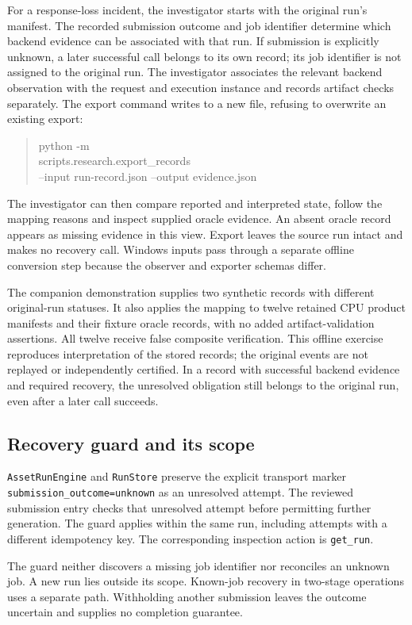 \documentclass[conference,letterpaper,10pt]{IEEEtran}
\begin{document}
For a response-loss incident, the investigator starts with the original run's
manifest. The recorded submission outcome and job identifier determine which
backend evidence can be associated with that run. If submission is explicitly
unknown, a later successful call belongs to its own record; its job identifier
is not assigned to the original run. The investigator associates the relevant
backend observation with the request and execution instance and records
artifact checks separately. The export command writes to a new file, refusing
to overwrite an existing export:
\begin{quote}\small\ttfamily
python -m\\
scripts.research.export\_records\\
--input run-record.json --output evidence.json
\end{quote}
The investigator can then compare reported and interpreted state, follow the
mapping reasons and inspect supplied oracle evidence. An absent oracle record
appears as missing evidence in this view. Export leaves the source run intact
and makes no recovery call. Windows inputs pass through a separate offline
conversion step because the observer and exporter schemas differ.

The companion demonstration supplies two synthetic records with different
original-run statuses. It also applies the mapping to twelve retained CPU
product manifests and their fixture oracle records, with no added
artifact-validation assertions. All twelve receive false composite verification.
This offline exercise reproduces interpretation of the stored records;
the original events are not replayed or independently certified. In a record
with successful backend evidence and required recovery, the unresolved
obligation still belongs to the original run, even after a later call succeeds.

\subsection{Recovery guard and its scope}

\texttt{AssetRunEngine} and \texttt{RunStore} preserve the explicit transport marker
\texttt{submission\_outcome=unknown} as an unresolved attempt. The reviewed submission
entry checks that unresolved attempt before permitting further generation.
The guard applies within the same run, including attempts with a different
idempotency key. The corresponding inspection action is \texttt{get\_run}.

The guard neither discovers a missing job identifier nor reconciles an unknown
job. A new run lies outside its scope. Known-job recovery in two-stage operations
uses a separate path. Withholding another submission leaves the outcome
uncertain and supplies no completion guarantee.
\end{document}
